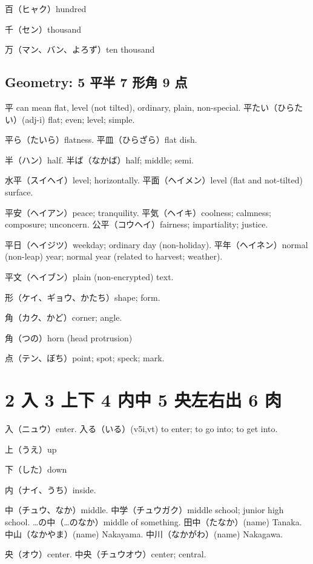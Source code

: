百（ヒャク）hundred

千（セン）thousand

万（マン、バン、よろず）ten thousand

\subsection{Geometry: 5 平半 7 形角 9 点}

平 can mean flat, level (not tilted), ordinary, plain, non-special.
平たい（ひらたい）(adj-i) flat; even; level; simple.

平ら（たいら）flatness.
平皿（ひらざら）flat dish.

半（ハン）half.
半ば（なかば）half; middle; semi.

水平（スイヘイ）level; horizontally.
平面（ヘイメン）level (flat and not-tilted) surface.

平安（ヘイアン）peace; tranquility.
平気（ヘイキ）coolness; calmness; composure; unconcern.
公平（コウヘイ）fairness; impartiality; justice.

平日（ヘイジツ）weekday; ordinary day (non-holiday).
平年（ヘイネン）normal (non-leap) year; normal year (related to harvest; weather).

平文（ヘイブン）plain (non-encrypted) text.

形（ケイ、ギョウ、かたち）shape; form.

角（カク、かど）corner; angle.

角（つの）horn (head protrusion)

点（テン、ぼち）point; spot; speck; mark.



\section{2 入 3 上下 4 内中 5 央左右出 6 肉}

入（ニュウ）enter.
入る（いる）(v5i,vt)
to enter; to go into; to get into.

上（うえ）up

下（した）down

内（ナイ、うち）inside.

中（チュウ、なか）middle.
中学（チュウガク）middle school; junior high school.
…の中（…のなか）middle of something.
田中（たなか）(name) Tanaka.
中山（なかやま）(name) Nakayama.
中川（なかがわ）(name) Nakagawa.

央（オウ）center.
中央（チュウオウ）center; central.

